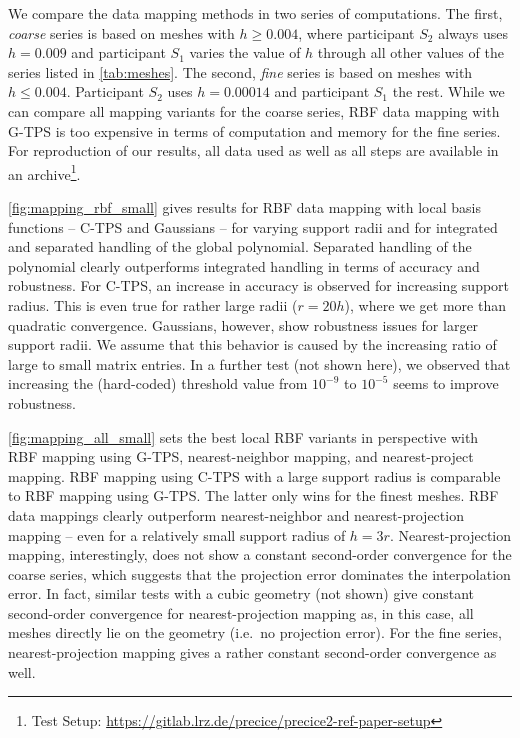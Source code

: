 We compare the data mapping methods in two series of computations. The first, \textit{coarse} series is based on meshes with $h \geq 0.004$, where participant $S_2$ always uses $h=0.009$ and participant $S_1$ varies the value of $h$ through all other values of the series listed in \autoref{tab:meshes}. The second, \textit{fine} series is based on meshes with $h \leq 0.004$. Participant $S_2$ uses $h=0.00014$ and participant $S_1$ the rest. While we can compare all mapping variants for the coarse series, RBF data mapping with G-TPS is too expensive in terms of computation and memory for the fine series.
For reproduction of our results, all data used as well as all steps are available in an archive\footnote{Test Setup: \url{https://gitlab.lrz.de/precice/precice2-ref-paper-setup}}.

\autoref{fig:mapping_rbf_small} gives results for RBF data mapping with local basis functions -- C-TPS and Gaussians -- for varying support radii and for integrated and separated handling of the global polynomial.
Separated handling of the polynomial clearly outperforms integrated handling in terms of accuracy and robustness. For C-TPS, an increase in accuracy is observed for increasing support radius. This is even true for rather large radii ($r=20h$), where we get more than quadratic convergence. Gaussians, however, show robustness issues for larger support radii. We assume that this behavior is caused by the increasing ratio of large to small matrix entries. In a further test (not shown here), we observed that increasing the (hard-coded) threshold value from $10^{-9}$ to $10^{-5}$ seems to improve robustness.

\autoref{fig:mapping_all_small} sets the best local RBF variants in perspective with RBF mapping using G-TPS, nearest-neighbor mapping, and nearest-project mapping. 
RBF mapping using C-TPS with a large support radius is comparable to RBF mapping using G-TPS. The latter only wins for the finest meshes. RBF data mappings clearly outperform nearest-neighbor and nearest-projection mapping -- even for a relatively small support radius of $h=3r$. Nearest-projection mapping, interestingly, does not show a constant second-order convergence for the coarse series, which suggests that the projection error dominates the interpolation error. In fact, similar tests with a cubic geometry (not shown) give constant second-order convergence for nearest-projection mapping as, in this case, all meshes directly lie on the geometry (i.e.~no projection error). For the fine series, nearest-projection mapping gives a rather constant second-order convergence as well. 


